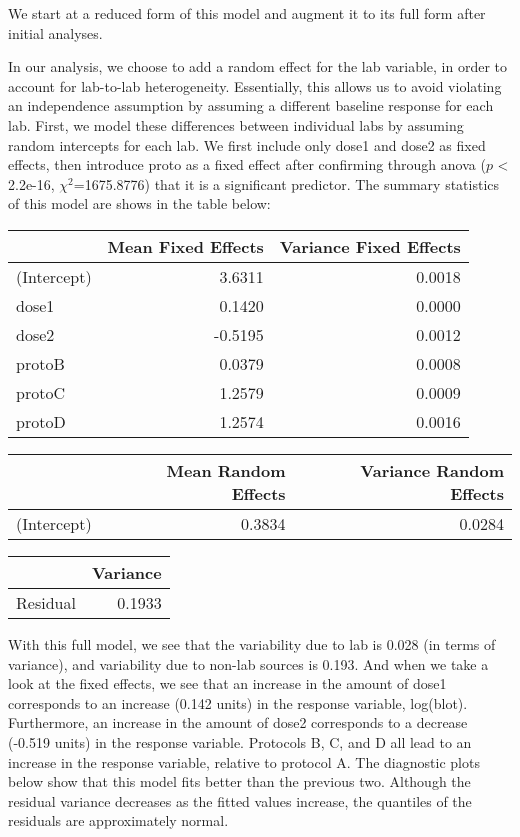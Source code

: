 \documentclass[]{article}
\begin{document}
We start at a reduced form of this model and augment it to its full form
after initial analyses.

In our analysis, we choose to add a random effect for the lab variable,
in order to account for lab-to-lab heterogeneity. Essentially, this
allows us to avoid violating an independence assumption by assuming a
different baseline response for each lab. First, we model these
differences between individual labs by assuming random intercepts for
each lab. We first include only dose1 and dose2 as fixed effects, then
introduce proto as a fixed effect after confirming through anova (\(p\)
\textless{} 2.2e-16, \(\chi^2\)=1675.8776) that it is a significant
predictor. The summary statistics of this model are shows in the table
below:

\begin{longtable}[]{@{}lrr@{}}
\toprule
& Mean Fixed Effects & Variance Fixed Effects\tabularnewline
\midrule
\endhead
(Intercept) & 3.6311 & 0.0018\tabularnewline
dose1 & 0.1420 & 0.0000\tabularnewline
dose2 & -0.5195 & 0.0012\tabularnewline
protoB & 0.0379 & 0.0008\tabularnewline
protoC & 1.2579 & 0.0009\tabularnewline
protoD & 1.2574 & 0.0016\tabularnewline
\bottomrule
\end{longtable}

\begin{longtable}[]{@{}lrr@{}}
\toprule
& Mean Random Effects & Variance Random Effects\tabularnewline
\midrule
\endhead
(Intercept) & 0.3834 & 0.0284\tabularnewline
\bottomrule
\end{longtable}

\begin{longtable}[]{@{}lr@{}}
\toprule
& Variance\tabularnewline
\midrule
\endhead
Residual & 0.1933\tabularnewline
\bottomrule
\end{longtable}

With this full model, we see that the variability due to lab is 0.028
(in terms of variance), and variability due to non-lab sources is 0.193.
And when we take a look at the fixed effects, we see that an increase in
the amount of dose1 corresponds to an increase (0.142 units) in the
response variable, log(blot). Furthermore, an increase in the amount of
dose2 corresponds to a decrease (-0.519 units) in the response variable.
Protocols B, C, and D all lead to an increase in the response variable,
relative to protocol A. The diagnostic plots below show that this model
fits better than the previous two. Although the residual variance
decreases as the fitted values increase, the quantiles of the residuals
are approximately normal.
\end{document}
